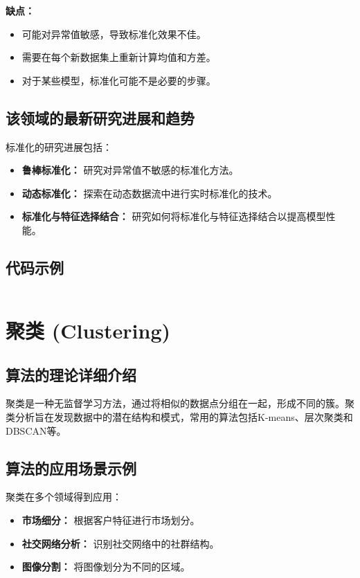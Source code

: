 \textbf{缺点：}
\begin{itemize}
    \item 可能对异常值敏感，导致标准化效果不佳。
    \item 需要在每个新数据集上重新计算均值和方差。
    \item 对于某些模型，标准化可能不是必要的步骤。
\end{itemize}

\subsection*{该领域的最新研究进展和趋势}
标准化的研究进展包括：
\begin{itemize}
    \item \textbf{鲁棒标准化：} 研究对异常值不敏感的标准化方法。
    \item \textbf{动态标准化：} 探索在动态数据流中进行实时标准化的技术。
    \item \textbf{标准化与特征选择结合：} 研究如何将标准化与特征选择结合以提高模型性能。
\end{itemize}
\subsection*{代码示例}
\begin{lstlisting}

\end{lstlisting}


\section{聚类 (Clustering)}
\subsection*{算法的理论详细介绍}
聚类是一种无监督学习方法，通过将相似的数据点分组在一起，形成不同的簇。聚类分析旨在发现数据中的潜在结构和模式，常用的算法包括K-means、层次聚类和DBSCAN等。

\subsection*{算法的应用场景示例}
聚类在多个领域得到应用：
\begin{itemize}
    \item \textbf{市场细分：} 根据客户特征进行市场划分。
    \item \textbf{社交网络分析：} 识别社交网络中的社群结构。
    \item \textbf{图像分割：} 将图像划分为不同的区域。
\end{itemize}

